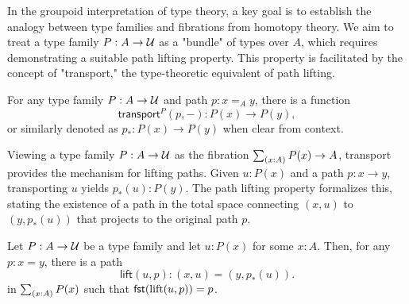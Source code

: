 \documentclass[main.tex]{subfiles}
\begin{document}
In the groupoid interpretation of type theory, a key goal is to establish the analogy between type families and fibrations from homotopy theory. We aim to treat a type family $P : A \to \mathcal{U}$ as a "bundle" of types over $A$, which requires demonstrating a suitable path lifting property. This property is facilitated by the concept of "transport," the type-theoretic equivalent of path lifting.
\begin{lemma}
    For any type family $P : A \to \mathcal{U}$ and path $p : x =_A y$, there is a function 
    \[\mathsf{transport}^P(p, -) : P(x) \to P(y),\]
    or similarly denoted as $p_* : P(x) \to P(y)$ when clear from context.
\end{lemma}
Viewing a type family $P : A \to \mathcal{U}$ as the fibration $\sm{x : A}P(x) \to A$, transport provides the mechanism for lifting paths. Given $u : P(x)$ and a path $p : x \to y$, transporting $u$ yields $p_*(u) : P(y)$. The path lifting property formalizes this, stating the existence of a path in the total space connecting $(x,u)$ to $(y, p_*(u))$ that projects to the original path $p$.

\begin{lemma}
    Let $P : A \to \mathcal{U}$ be a type family and let $u : P(x)$ for some $x : A$. Then, for any $p : x = y$, there is a path
    $$\mathsf{lift}(u,p) : (x,u) = (y, p_*(u)).$$
    in $\sm{x : A}P(x)$ such that $\mathsf{fst}(\text{lift}(u,p)) = p$.
\end{lemma}
\end{document}
